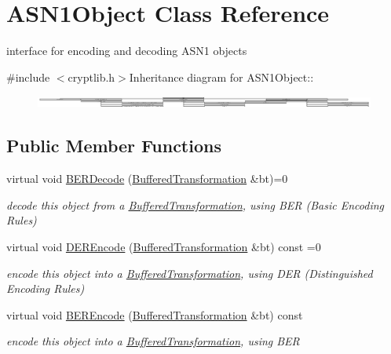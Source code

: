 \hypertarget{class_a_s_n1_object}{
\section{ASN1Object Class Reference}
\label{class_a_s_n1_object}
}


interface for encoding and decoding ASN1 objects  


{\ttfamily \#include $<$cryptlib.h$>$}Inheritance diagram for ASN1Object::\begin{figure}[H]
\begin{center}
\leavevmode
\includegraphics[height=0.40153cm]{class_a_s_n1_object}
\end{center}
\end{figure}
\subsection*{Public Member Functions}
\begin{DoxyCompactItemize}
\item 
\hypertarget{class_a_s_n1_object_a430af8c994bc78d996067247fa5a0770}{
virtual void \hyperlink{class_a_s_n1_object_a430af8c994bc78d996067247fa5a0770}{BERDecode} (\hyperlink{class_buffered_transformation}{BufferedTransformation} \&bt)=0}
\label{class_a_s_n1_object_a430af8c994bc78d996067247fa5a0770}

\begin{DoxyCompactList}\small\item\em decode this object from a \hyperlink{class_buffered_transformation}{BufferedTransformation}, using BER (Basic Encoding Rules) \item\end{DoxyCompactList}\item 
\hypertarget{class_a_s_n1_object_a10e40187a6ba048dfc8a2c8ca5c6c2ec}{
virtual void \hyperlink{class_a_s_n1_object_a10e40187a6ba048dfc8a2c8ca5c6c2ec}{DEREncode} (\hyperlink{class_buffered_transformation}{BufferedTransformation} \&bt) const =0}
\label{class_a_s_n1_object_a10e40187a6ba048dfc8a2c8ca5c6c2ec}

\begin{DoxyCompactList}\small\item\em encode this object into a \hyperlink{class_buffered_transformation}{BufferedTransformation}, using DER (Distinguished Encoding Rules) \item\end{DoxyCompactList}\item 
virtual void \hyperlink{class_a_s_n1_object_ab8446b61690a19015d3d565d86dd1d3d}{BEREncode} (\hyperlink{class_buffered_transformation}{BufferedTransformation} \&bt) const 
\begin{DoxyCompactList}\small\item\em encode this object into a \hyperlink{class_buffered_transformation}{BufferedTransformation}, using BER \item\end{DoxyCompactList}\end{DoxyCompactItemize}


